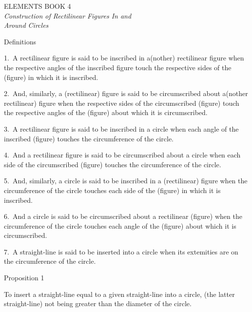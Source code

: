 \pagestyle{plain}
\begin{center}
{\Huge ELEMENTS BOOK 4}\\
\spa\spa\spa
{\huge\it Construction of Rectilinear Figures In and}\\[0.5ex] {\huge\it Around Circles}
\end{center}\newpage

\pagestyle{fancy}
\cfoot{\gr{\thepage}}

\begin{center}
{\large Definitions}
\end{center}

1.~A rectilinear figure is said to be inscribed in a(nother) rectilinear figure
when  the respective angles of the inscribed figure touch the respective
sides of the (figure) in which it is inscribed.

2.~And, similarly, a  (rectilinear) figure is said to be circumscribed about a(nother rectilinear) figure when the respective sides of the circumscribed
(figure) touch the respective angles of the (figure) about which it is
circumscribed.

3.~A rectilinear figure is said to be inscribed in a circle when
each angle of the inscribed (figure) touches the circumference of the
circle.

4.~And a rectilinear figure is said to be circumscribed about a circle
when each side of the circumscribed (figure) touches the
circumference of the circle.

5.~And, similarly, a circle is said to be inscribed in a (rectilinear) figure
when the circumference of the circle touches each  side of
the (figure) in which it is inscribed.

6.~And a circle is said to be circumscribed about a rectilinear (figure)
when the circumference of the circle touches each  angle of the
(figure) about which it is circumscribed.

7.~A straight-line is said to be inserted into a circle when its extemities
are on the circumference of the circle.


\begin{center}
{\large Proposition 1}
\end{center}

To insert a straight-line equal to
a given straight-line into a circle, (the latter straight-line) not being greater than the diameter of the circle.

